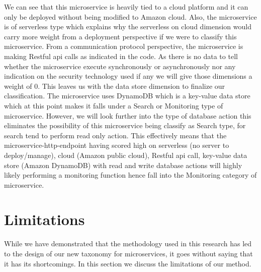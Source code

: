 \documentclass{article}
\begin{document}
We can see that this microservice is heavily tied to a cloud platform and it can only be deployed without being modified to Amazon cloud. Also, the microservice is of serverless type which explains why the serverless on cloud dimension would carry more weight from a deployment perspective if we were to classify this microservice. From a communication protocol perspective, the microservice is making Restful api calls as indicated in the code. As there is no data to tell whether the microservice execute synchronously or asynchronously nor any indication on the security technology used if any we will give those dimensions a weight of 0. This leaves us with the data store dimension to finalize our classification. The microservice uses DynamoDB which is a key-value data store which at this point makes it falls under a Search or Monitoring type of microservice. However, we will look further into the type of database action this eliminates the possibility of this microservice being classify as Search type, for search tend to perform read only action. This effectively means that the microservice-http-endpoint having scored high on serverless (no server to deploy/manage), cloud (Amazon public cloud), Restful api call, key-value data store (Amazon DynamoDB) with read and write database actions will highly likely performing a monitoring function hence fall into the Monitoring category of microservice.

\section{Limitations}

While we have demonstrated that the methodology used in this research has led to the design of our new taxonomy for microservices, it goes without saying that it has its shortcomings. In this section we discuss the limitations of our method.
\end{document}
